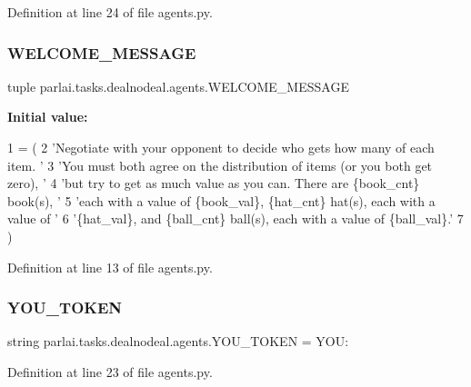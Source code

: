 Definition at line 24 of file agents.\+py.

\mbox{\label{namespaceparlai_1_1tasks_1_1dealnodeal_1_1agents_a1fee23e402c5fa284bb652c46941a65f}} 
\subsubsection{\texorpdfstring{W\+E\+L\+C\+O\+M\+E\+\_\+\+M\+E\+S\+S\+A\+GE}{WELCOME\_MESSAGE}}
{\footnotesize\ttfamily tuple parlai.\+tasks.\+dealnodeal.\+agents.\+W\+E\+L\+C\+O\+M\+E\+\_\+\+M\+E\+S\+S\+A\+GE}

{\bfseries Initial value\+:}
\begin{DoxyCode}
1 =  (
2     \textcolor{stringliteral}{'Negotiate with your opponent to decide who gets how many of each item. '}
3     \textcolor{stringliteral}{'You must both agree on the distribution of items (or you both get zero), '}
4     \textcolor{stringliteral}{'but try to get as much value as you can. There are \{book\_cnt\} book(s), '}
5     \textcolor{stringliteral}{'each with a value of \{book\_val\}, \{hat\_cnt\} hat(s), each with a value of '}
6     \textcolor{stringliteral}{'\{hat\_val\}, and \{ball\_cnt\} ball(s), each with a value of \{ball\_val\}.'}
7 )
\end{DoxyCode}


Definition at line 13 of file agents.\+py.

\mbox{\label{namespaceparlai_1_1tasks_1_1dealnodeal_1_1agents_a3065976d735a2293eed1605b579871ef}} 
\subsubsection{\texorpdfstring{Y\+O\+U\+\_\+\+T\+O\+K\+EN}{YOU\_TOKEN}}
{\footnotesize\ttfamily string parlai.\+tasks.\+dealnodeal.\+agents.\+Y\+O\+U\+\_\+\+T\+O\+K\+EN = \textquotesingle{}Y\+O\+U\+:\textquotesingle{}}



Definition at line 23 of file agents.\+py.

